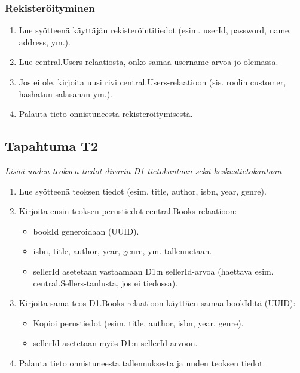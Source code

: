 \documentclass[11pt,a4paper]{article}
\begin{document}
\subsubsection{Rekisteröityminen}

\begin{enumerate}
	\item Lue syötteenä käyttäjän rekisteröintitiedot (esim. userId, password, name, address, ym.).
	\item Lue central.Users-relaatiosta, onko samaa username-arvoa jo olemassa.
	\item Jos ei ole, kirjoita uusi rivi central.Users-relaatioon (sis. roolin customer, hashatun salasanan ym.).
	\item Palauta tieto onnistuneesta rekisteröitymisestä.
\end{enumerate}

\subsection{Tapahtuma T2}
{\large{\textit{Lisää uuden teoksen tiedot divarin D1 tietokantaan sekä keskustietokantaan}}}

\begin{enumerate}
	\item Lue syötteenä teoksen tiedot (esim. title, author, isbn, year, genre).
	\item Kirjoita ensin teoksen perustiedot central.Books-relaatioon:
	      \begin{itemize}
		      \item bookId generoidaan (UUID).
		      \item isbn, title, author, year, genre, ym. tallennetaan.
		      \item sellerId asetetaan vastaamaan D1:n sellerId-arvoa (haettava esim. central.Sellers-taulusta, jos ei tiedossa).
	      \end{itemize}
	\item Kirjoita sama teos D1.Books-relaatioon käyttäen samaa bookId:tä (UUID):
	      \begin{itemize}
		      \item Kopioi perustiedot (esim. title, author, isbn, year, genre).
		      \item sellerId asetetaan myös D1:n sellerId-arvoon.
	      \end{itemize}
	\item Palauta tieto onnistuneesta tallennuksesta ja uuden teoksen tiedot.
\end{enumerate}
\end{document}
